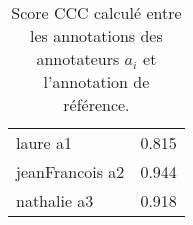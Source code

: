 \begin{table}
  \centering
  \begin{tabular}{|l|c|}
  \hline
  laure a1          &0.815 \\
  jeanFrancois a2   &0.944 \\
  nathalie a3       &0.918 \\
  \hline
  \end{tabular}
  \caption{Score CCC calculé entre les annotations des annotateurs $a_i$ et l'annotation de référence.}
  \label{tab:cccEntreAnnotateurs}
\end{table}

